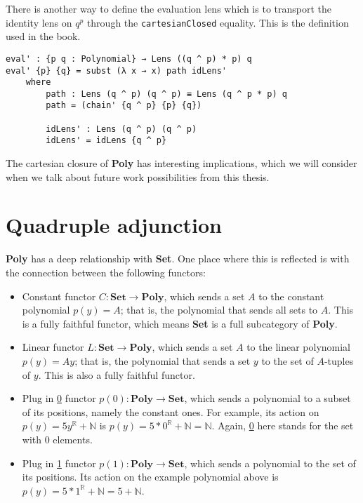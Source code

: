 There is another way to define the evaluation lens which is to transport the identity lens on $q^p$ through the \texttt{cartesianClosed} equality. 
This is the definition used in the book.
\begin{verbatim}
eval' : {p q : Polynomial} → Lens ((q ^ p) * p) q
eval' {p} {q} = subst (λ x → x) path idLens'
    where
        path : Lens (q ^ p) (q ^ p) ≡ Lens (q ^ p * p) q
        path = (chain' {q ^ p} {p} {q})

        idLens' : Lens (q ^ p) (q ^ p)
        idLens' = idLens {q ^ p}
\end{verbatim}

The cartesian closure of \textbf{Poly} has interesting implications, which we will consider when we talk about future work possibilities from this thesis.

\section{Quadruple adjunction}

\textbf{Poly} has a deep relationship with \textbf{Set}. One place where this is reflected is with the connection between the following functors:

\begin{itemize}
    \item Constant functor $C : \textbf{Set} \rightarrow \textbf{Poly}$, which sends a set $A$ to the constant polynomial $p(y) = A$; that is, the polynomial that sends all sets to $A$. This is a fully faithful functor, which means \textbf{Set} is a full subcategory of \textbf{Poly}.
    \item Linear functor $L : \textbf{Set} \rightarrow \textbf{Poly}$,  which sends a set $A$ to the linear polynomial $p(y) = Ay$; that is, the polynomial that sends a set $y$ to the set of $A$-tuples of $y$. This is also a fully faithful functor.
    \item Plug in \underline{0} functor $p(0) : \textbf{Poly} \rightarrow \textbf{Set}$, which sends a polynomial to a subset of its positions, namely the constant ones. For example, its action on $p(y) = 5y^{\mathbb{R}} + \mathbb{N}$ is $p(y) = 5*0^{\mathbb{R}} + \mathbb{N} = \mathbb{N}$. Again, \underline{0} here stands for the set with 0 elements.
    \item Plug in \underline{1} functor $p(1) : \textbf{Poly} \rightarrow \textbf{Set}$, which sends a polynomial to the set of its positions. Its action on the example polynomial above is $p(y) = 5*1^{\mathbb{R}} + \mathbb{N} = 5 + \mathbb{N}$.
\end{itemize}

